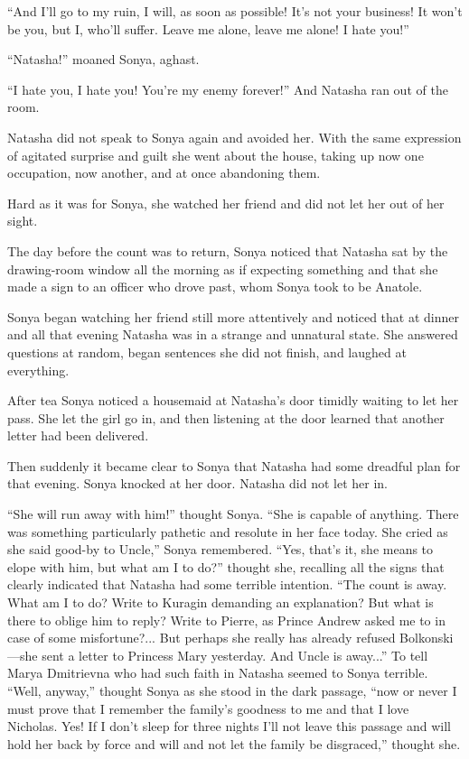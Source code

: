 ``And I'll go to my ruin, I will, as soon as possible! It's not
your business! It won't be you, but I, who'll suffer. Leave me
alone, leave me alone! I hate you!''

``Natasha!'' moaned Sonya, aghast.

``I hate you, I hate you! You're my enemy forever!'' And Natasha
ran out of the room.

Natasha did not speak to Sonya again and avoided her. With the
same expression of agitated surprise and guilt she went about the
house, taking up now one occupation, now another, and at once
abandoning them.

Hard as it was for Sonya, she watched her friend and did not let
her out of her sight.

The day before the count was to return, Sonya noticed that
Natasha sat by the drawing-room window all the morning as if
expecting something and that she made a sign to an officer who
drove past, whom Sonya took to be Anatole.

Sonya began watching her friend still more attentively and
noticed that at dinner and all that evening Natasha was in a
strange and unnatural state. She answered questions at random,
began sentences she did not finish, and laughed at everything.

After tea Sonya noticed a housemaid at Natasha's door timidly
waiting to let her pass. She let the girl go in, and then
listening at the door learned that another letter had been
delivered.

Then suddenly it became clear to Sonya that Natasha had some
dreadful plan for that evening. Sonya knocked at her
door. Natasha did not let her in.

``She will run away with him!'' thought Sonya. ``She is capable
of anything. There was something particularly pathetic and
resolute in her face today. She cried as she said good-by to
Uncle,'' Sonya remembered.  ``Yes, that's it, she means to elope
with him, but what am I to do?''  thought she, recalling all the
signs that clearly indicated that Natasha had some terrible
intention. ``The count is away. What am I to do? Write to Kuragin
demanding an explanation? But what is there to oblige him to
reply? Write to Pierre, as Prince Andrew asked me to in case of
some misfortune?... But perhaps she really has already refused
Bolkonski---she sent a letter to Princess Mary yesterday. And
Uncle is away...'' To tell Marya Dmitrievna who had such faith in
Natasha seemed to Sonya terrible.  ``Well, anyway,'' thought
Sonya as she stood in the dark passage, ``now or never I must
prove that I remember the family's goodness to me and that I love
Nicholas. Yes! If I don't sleep for three nights I'll not leave
this passage and will hold her back by force and will and not let
the family be disgraced,'' thought she.

